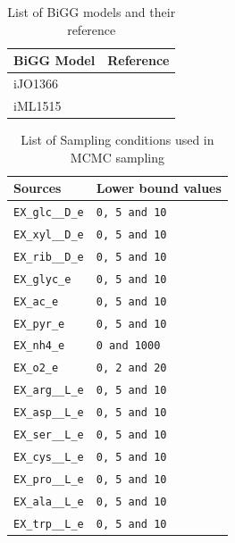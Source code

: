 \documentclass[12pt,chapterheads]{ucsd}
\begin{document}
\vspace{0.25in}
\begin{table}[!ht]
\caption[BiGG models]{List of BiGG models and their reference}

\vspace{-0.25in}
\begin{center}
\begin{tabular}{|p{1in}|p{1in}|}
\hline
BiGG Model  & Reference \\

\hline
iJO1366 & \cite{Orth535} \\

\hline
iML1515 & \cite{Monk2017} \\

\hline

\end{tabular}
\end{center}
\label{tab:bigg}
\end{table}


\vspace{0.25in}
\begin{table}[!ht]
\caption[Sampling conditions]{List of Sampling conditions used in MCMC sampling}

\vspace{-0.25in}
\begin{center}
\begin{tabular}{|p{1.2in}|p{1.4in}|}
\hline
Sources  & Lower bound values\\
\hline
\verb|EX_glc__D_e| & \verb|0, 5 and 10| \\
\hline
\verb|EX_xyl__D_e| &  \verb|0, 5 and 10| \\
\hline
\verb|EX_rib__D_e| &  \verb|0, 5 and 10| \\
\hline
\verb|EX_glyc_e| &  \verb|0, 5 and 10| \\
\hline
\verb|EX_ac_e| &  \verb|0, 5 and 10| \\
\hline
\verb|EX_pyr_e| &  \verb|0, 5 and 10| \\
\hline
\verb|EX_nh4_e| &  \verb|0 and 1000| \\
\hline
\verb|EX_o2_e| &  \verb|0, 2 and 20| \\
\hline
\verb|EX_arg__L_e| &  \verb|0, 5 and 10| \\
\hline
\verb|EX_asp__L_e| &  \verb|0, 5 and 10| \\
\hline
\verb|EX_ser__L_e| &  \verb|0, 5 and 10| \\
\hline
\verb|EX_cys__L_e| &  \verb|0, 5 and 10| \\
\hline
\verb|EX_pro__L_e| &  \verb|0, 5 and 10| \\
\hline
\verb|EX_ala__L_e| &  \verb|0, 5 and 10| \\
\hline
\verb|EX_trp__L_e| &  \verb|0, 5 and 10| \\
\hline

\end{tabular}
\end{center}
\label{tab:sampling}
\end{table}
\end{document}
